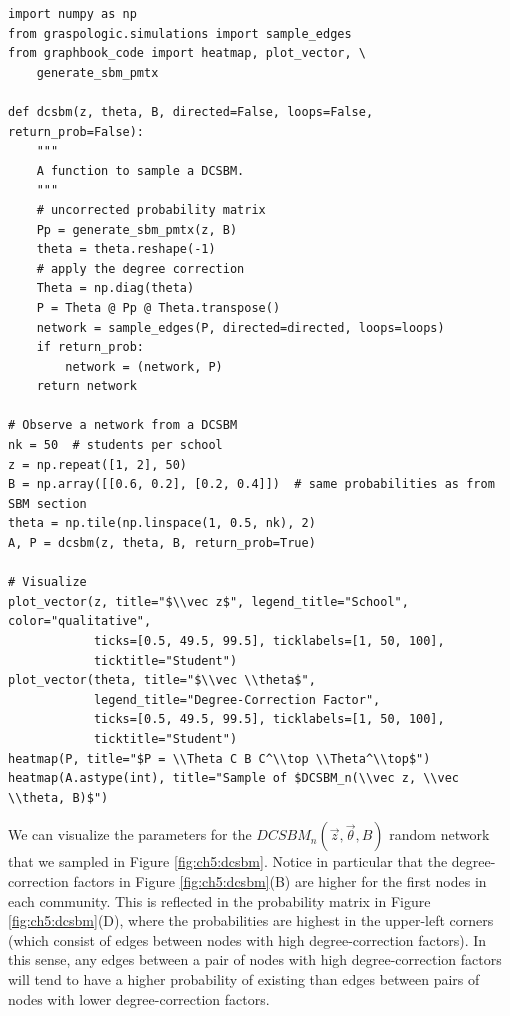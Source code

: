 \begin{lstlisting}[style=python]
import numpy as np
from graspologic.simulations import sample_edges
from graphbook_code import heatmap, plot_vector, \
    generate_sbm_pmtx

def dcsbm(z, theta, B, directed=False, loops=False, return_prob=False):
    """
    A function to sample a DCSBM.
    """
    # uncorrected probability matrix
    Pp = generate_sbm_pmtx(z, B)
    theta = theta.reshape(-1)
    # apply the degree correction
    Theta = np.diag(theta)
    P = Theta @ Pp @ Theta.transpose()
    network = sample_edges(P, directed=directed, loops=loops)
    if return_prob:
        network = (network, P)
    return network

# Observe a network from a DCSBM
nk = 50  # students per school
z = np.repeat([1, 2], 50)
B = np.array([[0.6, 0.2], [0.2, 0.4]])  # same probabilities as from SBM section
theta = np.tile(np.linspace(1, 0.5, nk), 2)
A, P = dcsbm(z, theta, B, return_prob=True)

# Visualize
plot_vector(z, title="$\\vec z$", legend_title="School", color="qualitative", 
            ticks=[0.5, 49.5, 99.5], ticklabels=[1, 50, 100],
            ticktitle="Student")
plot_vector(theta, title="$\\vec \\theta$", 
            legend_title="Degree-Correction Factor", 
            ticks=[0.5, 49.5, 99.5], ticklabels=[1, 50, 100],
            ticktitle="Student")
heatmap(P, title="$P = \\Theta C B C^\\top \\Theta^\\top$")
heatmap(A.astype(int), title="Sample of $DCSBM_n(\\vec z, \\vec \\theta, B)$")
\end{lstlisting}
We can visualize the parameters for the $DCSBM_n(\vec z, \vec \theta, B)$ random network that we sampled in Figure \ref{fig:ch5:dcsbm}. Notice in particular that the degree-correction factors in Figure \ref{fig:ch5:dcsbm}(B) are higher for the first nodes in each community. This is reflected in the probability matrix in Figure \ref{fig:ch5:dcsbm}(D), where the probabilities are highest in the upper-left corners (which consist of edges between nodes with high degree-correction factors). In this sense, any edges between a pair of nodes with high degree-correction factors will tend to have a higher probability of existing than edges between pairs of nodes with lower degree-correction factors.

